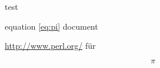 \documentclass{article}
\begin{document}
test

equation \ref{eq:pi}
\newpage
document

\url{http://www.perl.org/}
\newpage
f\"ur

\begin{equation}
\pi \label{eq:pi}
\end{equation}
\end{document}
